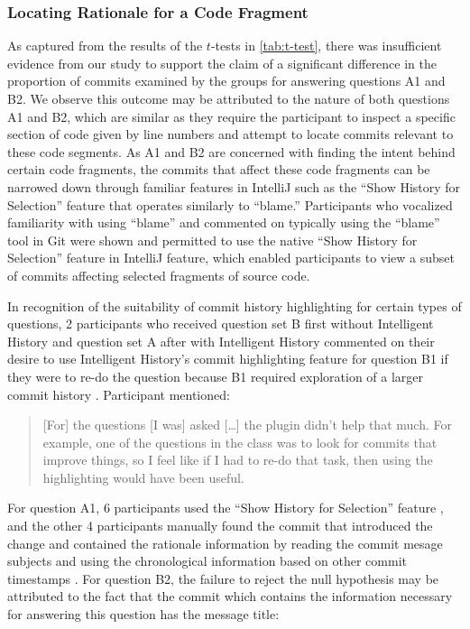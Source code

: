 \subsubsection{Locating Rationale for a Code Fragment}

As captured from the results of the $t$-tests in \autoref{tab:t-test}, 
there was insufficient evidence from our study to support the claim of a significant difference in 
the proportion of commits examined by the groups for answering questions A1 and B2.
We observe this outcome may be attributed to the nature of both questions A1 and B2, 
which are similar as they require the participant to  inspect a specific section of code 
given by line numbers and attempt to locate commits relevant to these code segments.
As A1 and B2 are concerned with finding the intent behind certain code fragments, 
the commits that affect these code fragments can be narrowed down
through familiar features in IntelliJ such as the ``Show History for Selection'' feature 
that operates similarly to  ``blame.''
Participants who vocalized familiarity with using  ``blame'' and commented on typically
using the ``blame'' tool in Git were shown and permitted to use the native 
``Show History for Selection'' feature in IntelliJ feature, 
which enabled participants to view a subset of commits affecting selected fragments of source code.

In recognition of the suitability of commit history highlighting for certain types of questions,
2 participants who received question set B first without Intelligent History and question set A 
after with Intelligent History commented on their desire to use Intelligent History's commit highlighting feature for question B1
if they were to re-do the question because B1 required exploration of a larger commit history .
Participant  mentioned:

\begin{quote}
  [For] the questions [I was] asked [\dots] the plugin didn’t help that much. 
  For example, one of the questions in the  class was to look for commits that improve things, 
  so I feel like if I had to re-do that task, then using the highlighting would have been useful.
\end{quote}

For question A1, 6 participants used the ``Show History for Selection'' feature ,
and the other 4 participants manually found the commit that introduced the change and contained the rationale information by reading the commit mesage subjects and using the chronological information based on other commit timestamps .
For question B2, the failure to reject the null hypothesis may be attributed to the fact that the commit  which contains the information necessary for answering this question has the message title: 

